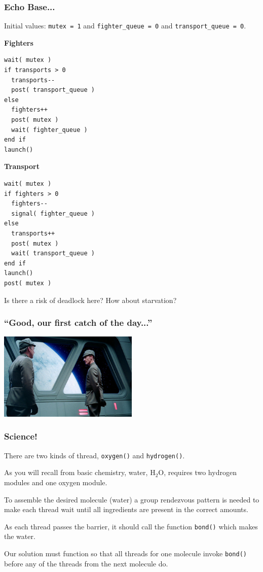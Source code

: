 \begin{frame}[fragile]
\frametitle{Echo Base...}

Initial values: \texttt{mutex = 1} and \texttt{fighter\_queue = 0} and \texttt{transport\_queue = 0}.

\begin{multicols}{2}
\textbf{Fighters}\vspace{-2em}
\begin{verbatim}
wait( mutex )
if transports > 0
  transports--
  post( transport_queue )
else 
  fighters++
  post( mutex )
  wait( fighter_queue )
end if  
launch()
\end{verbatim}
\columnbreak

\textbf{Transport}\vspace{-1em}
\begin{verbatim}
wait( mutex )
if fighters > 0
  fighters--
  signal( fighter_queue )
else
  transports++
  post( mutex )
  wait( transport_queue )
end if
launch()
post( mutex )
\end{verbatim}
\end{multicols}

Is there a risk of deadlock here? How about starvation?

\end{frame}


\begin{frame}
\frametitle{``Good, our first catch of the day...''}

\begin{center}
	\includegraphics[width=0.5\textwidth]{images/catch.jpg}
\end{center}

\end{frame}


\begin{frame}
	\frametitle{Science!}

	There are two kinds of thread, \texttt{oxygen()} and \texttt{hydrogen()}.

	As you will recall from basic chemistry, water, H$_{2}$O, requires two hydrogen modules and one oxygen module.

	To assemble the desired molecule (water) a group rendezvous pattern is needed to make each thread wait until all ingredients are present in the correct amounts.

	As each thread passes the barrier, it should call the function \texttt{bond()} which makes the water.

	Our solution must function so that all threads for one molecule invoke \texttt{bond()} before any of the threads from the next molecule do.

\end{frame}


